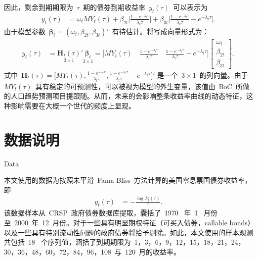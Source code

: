 因此，剩余到期期限为~$\tau$~期的债券到期收益率~$y_t(\tau)$~可以表示为
 \begin{align}\label{subsection:The Model:y}
   y_{t}(\tau) & = \omega_t MY_{t}(\tau)
        + \beta_{2t} \big[\frac{1-e^{-\lambda_{t} \tau}} {\lambda_{t} \tau} \big]
        + \beta_{3t}\big[\frac{1-e^{-\lambda_{t} \tau}} {\lambda_{t} \tau} - e^{-\lambda_{t} \tau} \big].
 \end{align}
 由于模型参数~$\mathbf{\beta}_t=(\omega_t,\beta_{2t},\beta_{3t})'$~有待估计。将写成向量形式为：
  \begin{align}
   y_{t}(\tau) & = \underset{3\times1} {\mathbf{H}_{t}(\tau)}
   {}'{}  \underset{3\times1} {\mathbf{\beta}_t}
   = \big[MY_{t}(\tau)  \quad
   \frac{1-e^{-\lambda_{t} \tau}} {\lambda_{t} \tau} \quad
   \frac{1-e^{-\lambda_{t} \tau}} {\lambda_{t} \tau} - e^{-\lambda_{t} \tau} \big]
   \begin{bmatrix}
     \omega_t \\
     \beta_{2t}\\
     \beta_{3t}
   \end{bmatrix},
 \end{align}
 式中~$\mathbf{H}_{t}(\tau)=\big[MY_{t}(\tau),
   \frac{1-e^{-\lambda_{t} \tau}} {\lambda_{t} \tau},
   \frac{1-e^{-\lambda_{t} \tau}} {\lambda_{t} \tau} - e^{-\lambda_{t} \tau} \big]'$ 是一个~$3\times 1$~的列向量。由于~$MY_{t}(\tau)$~具有稳定的可预测性，可以被视为模型的外生变量，该值由~BoC~所做的人口趋势预测项目提跟随。从而，未来的\dsf 会影响整条收益率曲线的动态特征，这种影响需要在大概一个世代的频度上显现。

\section{数据说明}{Data}

本文使用的数据为按照未平滑~Fama-Bliss~方法计算的美国零息票国债券收益率，即
\begin{align}
  y_t(\tau) &= -\frac{\log P_t(\tau)}{\tau}.
\end{align}
该数据样本从~CRSP~政府债券数据库提取，囊括了~1970~ 年~1~ 月份至~2000~年~12~月份。对于一些具有明显期权特征（可买入债券，callable bonds）以及一些具有特别流动性问题的政府债券将给予剔除。如此，本文使用的样本观测共包括~18~ 个序列值，涵括了到期期限为~1，3，6，9，12，15，18，21，24，30，36，48，60，72，84，96，108~与~120~月的收益率。

